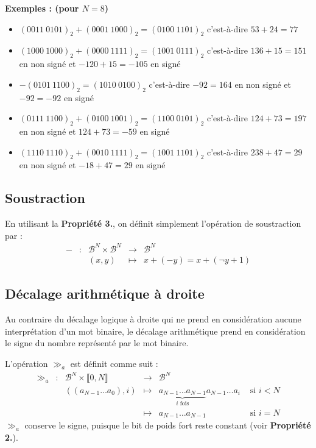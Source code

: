 \documentclass[../../main.tex]{subfiles}
\begin{document}
\textbf{Exemples : (pour $N = 8$)}
\begin{itemize}
  \item $(0011\ 0101)_{2} + (0001\ 1000)_{2} = (0100\ 1101)_{2}$\newline
    c'est-à-dire $53 + 24 = 77$
  \item $(1000\ 1000)_{2} + (0000\ 1111)_{2} = (1001\ 0111)_{2}$\newline
    c'est-à-dire $136 + 15 = 151$ en non signé et $-120 + 15 = -105$ en signé
  \item $-(0101\ 1100)_{2} = (1010\ 0100)_{2}$\newline
    c'est-à-dire $-92 = 164$ en non signé et $-92 = -92$ en signé
  \item $(0111\ 1100)_{2} + (0100\ 1001)_{2} = (1100\ 0101)_{2}$\newline
    c'est-à-dire $124 + 73 = 197$ en non signé et $124 + 73 = -59$ en signé
  \item $(1110\ 1110)_{2} + (0010\ 1111)_{2} = (1001\ 1101)_{2}$\newline
    c'est-à-dire $238 + 47 = 29$ en non signé et $-18 + 47 = 29$ en signé
\end{itemize}
\subsection{Soustraction} \label{sub:soustraction}
En utilisant la \textbf{Propriété 3.}, on définit simplement l'opération de soustraction par :
$$
\begin{array}{lclcl}
- & : & \mathcal{B}^{N}\times{\mathcal{B}^{N}} & \rightarrow & \mathcal{B}^{N} \\
     &   & (x, y) & \mapsto & x + (-y) = x + (\neg{y} + 1)
\end{array}
$$
\subsection{Décalage arithmétique à droite} \label{sub:d_calage_arithm_tique_droite}
Au contraire du décalage logique à droite qui ne prend en considération aucune interprétation d'un mot binaire, le décalage arithmétique prend en considération le signe du nombre représenté par le mot binaire.

L'opération $\gg_{a}$ est définit comme suit :
$$
\begin{array}{lclcll}
\gg_{a} & : & \mathcal{B}^{N}\times{\llbracket0, N\rrbracket} & \rightarrow & \mathcal{B}^{N} \\
     &   & ((a_{N-1}\dots a_{0}), i) & \mapsto & \underbrace{a_{N-1}\dots a_{N-1}}_{\text{$i$ fois}}a_{N-1}\dots a_{i} & \text{ si $i < N$} \\
     &   & & \mapsto & a_{N-1}\dots a_{N-1} & \text{ si $i = N$}
\end{array}
$$
$\gg_{a}$ conserve le signe, puisque le bit de poids fort reste constant (voir \textbf{Propriété 2.}).
\end{document}
